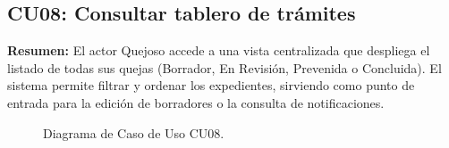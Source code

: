 \begin{appendices}
\newpage

\subsection{CU08: Consultar tablero de trámites}

\textbf{Resumen:} 
El actor Quejoso accede a una vista centralizada que despliega el listado de todas sus quejas (Borrador, En Revisión, Prevenida o Concluida). El sistema permite filtrar y ordenar los expedientes, sirviendo como punto de entrada para la edición de borradores o la consulta de notificaciones.

\begin{figure}[htbp]
    \centering
    \figCUocho
    \caption{Diagrama de Caso de Uso CU08.}
    \label{fig:cu08}
\end{figure}


\end{appendices}
